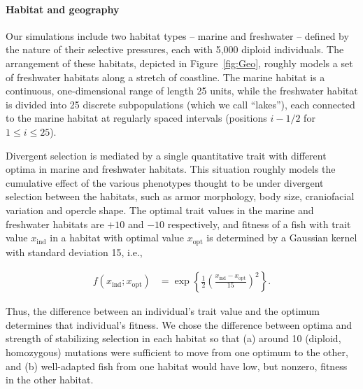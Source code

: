 \documentclass{article}
\begin{document}
\paragraph{Habitat and geography}
Our simulations include two habitat types -- marine and freshwater -- defined by the nature of their selective pressures, each with 5,000 diploid individuals. 
The arrangement of these habitats, depicted in Figure~\ref{fig:Geo}, roughly models a set of freshwater habitats along a stretch of coastline. 
The marine habitat is a continuous, one-dimensional range of length 25 units, while the freshwater habitat is divided into 25 discrete subpopulations (which we call ``lakes''), each connected to the marine habitat at regularly spaced intervals (positions $i - 1/2$ for $1 \le i \le 25$).

Divergent selection is mediated by a single quantitative trait with different optima in marine and freshwater habitats. 
This situation roughly models the cumulative effect of the various phenotypes thought to be under divergent selection between the habitats, such as armor morphology, body size, craniofacial variation and opercle shape.
The optimal trait values in the marine and freshwater habitats are $+10$ and $-10$ respectively, and fitness of a fish with trait value $x_\text{ind}$ in a habitat with optimal value $x_\text{opt}$ is determined by a Gaussian kernel with standard deviation 15, i.e.,

\begin{align*}
    f(x_\text{ind}; x_\text{opt})
    &=
    \exp\left\{
        \frac{1}{2}
            \left(
            \frac{x_\text{ind}-x_\text{opt}}{15}
            \right)^2
        \right\} .
\end{align*}

Thus, the difference between an individual's trait value and the optimum determines that individual's fitness. 
We chose the difference between optima and strength of stabilizing selection in each habitat so that (a) around 10 (diploid, homozygous) mutations were sufficient to move from one optimum to the other, and (b) well-adapted fish from one habitat would have low, but nonzero, fitness in the other habitat.
\end{document}
